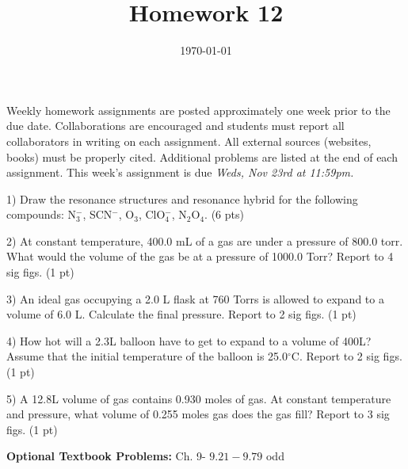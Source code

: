 \documentclass[12pt]{article}
\title{\textbf{Homework 12}}
\date{\vspace{-2em}\today}
\begin{document}
\maketitle 

Weekly homework assignments are posted approximately one week prior to the
due date. Collaborations are encouraged and students must report all collaborators
in writing on each assignment. All external sources (websites, books) must be
properly cited. Additional problems are listed at the end of each assignment.
This week's assignment is due \textit{Weds, Nov 23rd at 11:59pm.}

1) Draw the resonance structures and resonance hybrid for the following compounds:
N$_3^-$, SCN$^-$, O$_3$, ClO$_4^-$, N$_2$O$_4$. (6 pts)

\vspace{2,5in}

2) At constant temperature, 400.0 mL of a gas are under a pressure of 800.0 torr. What would
the volume of the gas be at a pressure of 1000.0 Torr? Report to 4 sig figs. (1 pt)

\vspace{2.5in}

3) An ideal gas occupying a 2.0 L flask at 760 Torrs is allowed to expand to a volume
of 6.0 L. Calculate the final pressure. Report to 2 sig figs. (1 pt)

\vspace{1.5in}

4) How hot will a 2.3L balloon have to get to expand to a volume of 400L?
Assume that the initial temperature of the balloon is 25.0$^\circ$C. Report to 2 sig figs.
(1 pt)

\vspace{1.5in}

5) A 12.8L volume of gas contains 0.930 moles of gas. At constant temperature and pressure,
what volume of 0.255 moles gas does the gas fill? Report to 3 sig figs. (1 pt)

\vfill

\textbf{Optional Textbook Problems:} Ch. 9- $9.21 - 9.79$ odd
\end{document}
